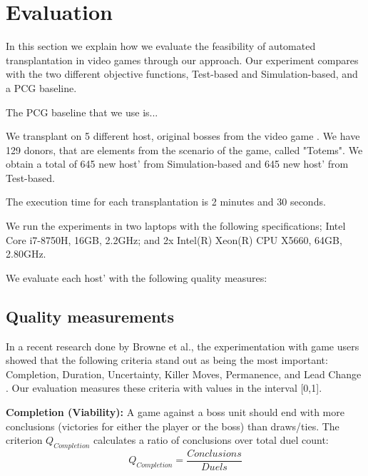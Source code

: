 \section{Evaluation} \label{sec:Evaluation}

In this section we explain how we evaluate the feasibility of automated transplantation in video games through our \ApproachName{} approach. Our experiment compares \ApproachName{} with the two different objective functions, Test-based and Simulation-based, and a PCG baseline. 

The PCG baseline that we use is... 

We transplant on 5 different host, original bosses from the video game \CaseStudy{}. We have 129 donors, that are elements from the scenario of the game, called "Totems". We obtain a total of 645 new host' from Simulation-based and 645 new host' from Test-based. 

The execution time for each transplantation is 2 minutes and 30 seconds.

We run the experiments in two laptops with the following specifications; Intel Core i7-8750H, 16GB, 2.2GHz; and  2x Intel(R) Xeon(R) CPU X5660, 64GB, 2.80GHz.

We evaluate each host' with the following quality measures:

\subsection{Quality measurements}
\label{subsec:Measurements}

In a recent research done by Browne et al., the experimentation with game users showed that the following criteria stand out as being the most important: Completion, Duration, Uncertainty, Killer Moves, Permanence, and Lead Change \cite{browne2010evolutionary}. Our evaluation measures these criteria with values in the interval [0,1].

{\bf Completion (Viability):} A game against a boss unit should end with more conclusions (victories for either the player or the boss) than draws/ties. The criterion $Q_{Completion}$ calculates a ratio of conclusions over total duel count:
\begin{equation}
Q_{Completion} = \frac{Conclusions}{Duels}
\end{equation}

